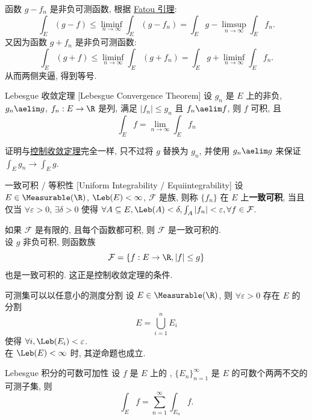 \begin{prf}
    函数 \(g-f_n\) 是非负可测函数, 根据 \hyperref[thm:fatou]{Fatou 引理}:
    \[\int_E (g-f) \leq \liminf_{n\to\infty} \int_E (g-f_n) = \int_E g - \limsup_{n\to\infty} \int_E f_n.\]
    又因为函数 \(g+f_n\) 是非负可测函数:
    \[\int_E (g+f) \leq \liminf_{n\to\infty} \int_E (g+f_n) = \int_E g + \liminf_{n\to\infty} \int_E f_n.\]
    从而两侧夹逼, 得到等号.
\end{prf}
\begin{thm}
    [lct]
    {Lebesgue 收敛定理}
    [Lebesgue Convergence Theorem]
    设 \(g_n\) 是 \(E\) 上的非负\MeasurableFunc{}, \(g_n\aelim g\), \(f_n:E\to\R\) 是\MeasurableFunc{}列, 满足 \(|f_n|\leq g_n\) 且 \(f_n\aelim f\), 则 \(f\) 可积, 且
    \[\int_E f = \lim_{n\to\infty} \int_E f_n\]
\end{thm}
\begin{prf}
    证明与\hyperref[thm:dct]{控制收敛定理}完全一样, 只不过将 \(g\) 替换为 \(g_n\), 并使用 \(g_n\aelim g\) 来保证 \(\int_E g_n\to \int_E g\).
\end{prf}
\begin{dfn}
    {一致可积 / 等积性}
    [Uniform Integrability / Equiintegrability]
    设 $E\in\Measurable(\R)$, \(\Leb(E)<\infty\), \(\mathcal{F}\) 是\MeasurableFunc{}族, 则称 \(\{f_n\}\) 在 \(E\) 上\textbf{一致可积}, 当且仅当 
    \(\forall\varepsilon>0\), \(\exists \delta>0\) 使得 $\forall A\subseteq E, \Leb(A)<\delta, \int_A |f_n|<\varepsilon, \forall f\in\mathcal{F}$.
\end{dfn}
\begin{rmk}
    如果 \(\mathcal{F}\) 是有限的, 且每个函数都可积, 则 \(\mathcal{F}\) 是一致可积的. \\
    设 $g$ 非负可积, 则函数族
    \[\mathcal{F}=\{f:E\to\R, |f|\leq g\}\]
    也是一致可积的. 这正是控制收敛定理的条件.
\end{rmk}
\begin{thm}
    {可测集可以以任意小的测度分割}
    设 $E\in\Measurable(\R)$, 则 \(\forall\varepsilon>0\) 存在 $E$ 的分割 
    \[E=\bigcup_{i=1}^n E_i\]
    使得 \(\forall i, \Leb(E_i)<\varepsilon\).\\
    在 $\Leb(E)<\infty$ 时, 其逆命题也成立.
\end{thm}
\begin{thm}
    {Lebesgue 积分的可数可加性}
    设 \(f\) 是 \(E\) 上的 \MeasurableFunc{}, \(\{E_n\}_{n=1}^{\infty}\) 是 \(E\) 的可数个两两不交的可测子集, 则
    \[\int_E f = \sum_{n=1}^{\infty} \int_{E_n} f.\]
\end{thm}
